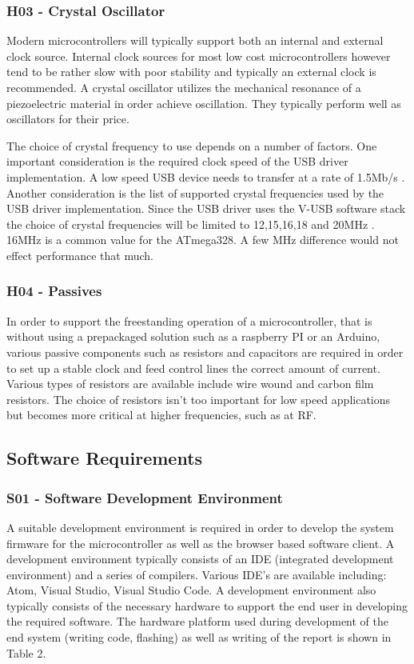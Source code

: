\subsubsection{H03 - Crystal Oscillator }
Modern microcontrollers will typically support both an internal and external clock source. Internal clock sources for most low cost microcontrollers however tend to be rather slow with poor stability and typically an external clock is recommended. A crystal oscillator utilizes the mechanical resonance of a piezoelectric material in order achieve oscillation. They typically perform well as oscillators for their price.

The choice of crystal frequency to use depends on a number of factors. One important consideration is the required clock speed of the USB driver implementation. A low speed USB device needs to transfer at a rate of 1.5Mb/s \cite{usb_speed}. Another consideration is the list of supported crystal frequencies used by the USB driver implementation. Since the USB driver uses the V-USB software stack the choice of crystal frequencies will be limited to 12,15,16,18 and 20MHz \cite{vusb}. 16MHz is a common value for the ATmega328. A few MHz difference would not effect performance that much.

\subsubsection{H04 - Passives }
In order to support the freestanding operation of a microcontroller, that is without using a prepackaged solution such as a raspberry PI or an Arduino, various passive components such as resistors and capacitors are required in order to set up a stable clock and feed control lines the correct amount of current. Various types of resistors are available include wire wound and carbon film resistors. The choice of resistors isn't too important for low speed applications but becomes more critical at higher frequencies, such as at RF.
\subsection{Software Requirements}
\subsubsection{S01 - Software Development Environment}
A suitable development environment is required in order to develop the system firmware for the microcontroller as well as the browser based software client. A development environment typically consists of an IDE (integrated development environment) and a series of compilers. Various IDE's are available including: Atom, Visual Studio, Visual Studio Code. A development environment also typically consists of the necessary hardware to support the end user in developing the required software. The hardware platform used during development of the end system (writing code, flashing) as well as writing of the report is shown in Table 2. 

